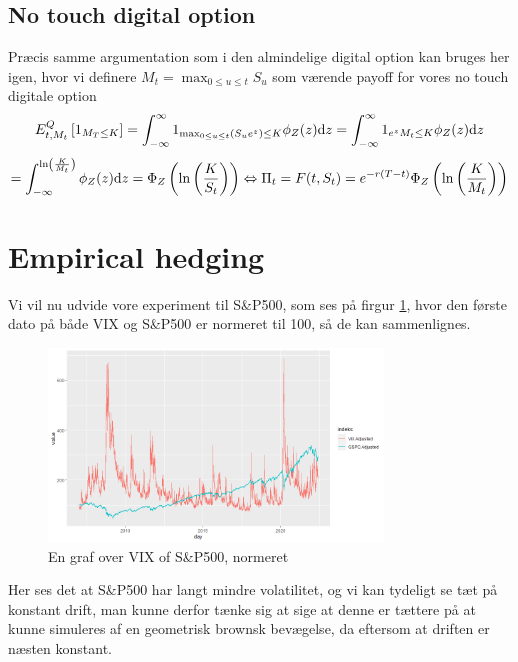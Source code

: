 \documentclass{article}
\theoremstyle{definition}
\theoremstyle{remark}
\newcommand\ens{\Leftrightarrow}
\begin{document}
\subsection{No touch digital option}
Præcis samme argumentation som i den almindelige digital option kan bruges her igen, hvor vi definere $M_t=\max_{0\leq u\leq t}S_u$ som værende payoff for vores no touch digitale option
$$E^Q_{t,M_t}\left[1_{M_T\leq K}\right]=\int_{-\infty}^{\infty}1_{\max_{0\leq u\leq t} (S_ue^{z})\leq K}\phi_Z(z)\text dz=\int_{-\infty}^{\infty}1_{e^{z}M_t\leq K}\phi_Z(z)\text dz$$
$$=\int_{-\infty}^{\ln\left(\frac K{M_t}\right)}\phi_Z(z)\text d z=\Phi_Z\left(\ln\left(\frac{K}{S_t}\right)\right)\ens \Pi_t=F(t,S_t)=e^{-r(T-t)}\Phi_Z\left(\ln\left(\frac{K}{M_t}\right)\right)$$

\section{Empirical hedging}
Vi vil nu udvide vore experiment til S\&P500, som ses på firgur \ref{fig:VIXSP500}, hvor den første dato på både VIX og S\&P500 er normeret til 100, så de kan sammenlignes.
\begin{figure}
    \centering
    \includegraphics[width=3.5in]{Rplot30.png}
    \caption{En graf over VIX of S\&P500, normeret}
    \label{fig:VIXSP500}
\end{figure}
Her ses det at S\&P500 har langt mindre volatilitet, og vi kan tydeligt se tæt på konstant drift, man kunne derfor tænke sig at sige at denne er tættere på at kunne simuleres af en geometrisk brownsk bevægelse, da eftersom at driften er næsten konstant.



\newpage





\end{document}
